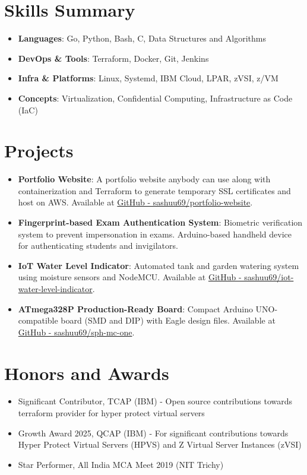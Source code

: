 \documentclass[a4paper,20pt]{article}
\newcommand{\resumeItem}[2]{
  \item\small{\textbf{#1}{: #2 \vspace{-2pt}}}
}
\newcommand{\resumeSubItem}[2]{\resumeItem{#1}{#2}\vspace{-3pt}}
\newcommand{\resumeSubHeadingListStart}{\begin{itemize}[leftmargin=*]}
\newcommand{\resumeSubHeadingListEnd}{\end{itemize}}
\begin{document}
\vspace{+5pt}
\section{Skills Summary}
    \resumeSubHeadingListStart
        \resumeSubItem{Languages}{Go, Python, Bash, C, Data Structures and Algorithms}
        \resumeSubItem{DevOps \& Tools}{Terraform, Docker, Git, Jenkins}
        \resumeSubItem{Infra \& Platforms}{Linux, Systemd, IBM Cloud, LPAR, zVSI, z/VM}
        \resumeSubItem{Concepts}{Virtualization, Confidential Computing, Infrastructure as Code (IaC)}
    \resumeSubHeadingListEnd

\vspace{+5pt}
\section{Projects}
    \resumeSubHeadingListStart
        \resumeSubItem
            {Portfolio Website}
            {A portfolio website anybody can use along with containerization and Terraform to generate temporary SSL certificates and host on AWS. Available at \href{https://github.com/sashuu69/portfolio-website}{GitHub - sashuu69/portfolio-website}.}
        \resumeSubItem
            {Fingerprint-based Exam Authentication System}
            {Biometric verification system to prevent impersonation in exams. Arduino-based handheld device for authenticating students and invigilators.}
        \resumeSubItem
            {IoT Water Level Indicator}
            {Automated tank and garden watering system using moisture sensors and NodeMCU. Available at \href{https://github.com/sashuu69/iot-water-level-indicator}{GitHub - sashuu69/iot-water-level-indicator}.}
        \resumeSubItem
            {ATmega328P Production-Ready Board}
            {Compact Arduino UNO-compatible board (SMD and DIP) with Eagle design files. Available at \href{https://github.com/sashuu69/sph-mc-one}{GitHub - sashuu69/sph-mc-one}.}
    \resumeSubHeadingListEnd

\vspace{+5pt}
\section{Honors and Awards}
    \begin{itemize}
        \item Significant Contributor, TCAP (IBM) - Open source contributions towards terraform provider for hyper protect virtual servers
        \item Growth Award 2025, QCAP (IBM) - For significant contributions towards Hyper Protect Virtual Servers (HPVS) and Z Virtual Server Instances (zVSI)
        \item Star Performer, All India MCA Meet 2019 (NIT Trichy)
    \end{itemize}
\end{document}
